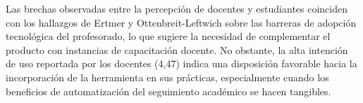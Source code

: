 Las brechas observadas entre la percepción de docentes y estudiantes coinciden con los hallazgos de Ertmer y Ottenbreit-Leftwich \cite{ref08_ertmer} sobre las barreras de adopción tecnológica del profesorado, lo que sugiere la necesidad de complementar el producto con instancias de capacitación docente. No obstante, la alta intención de uso reportada por los docentes (4,47) indica una disposición favorable hacia la incorporación de la herramienta en sus prácticas, especialmente cuando los beneficios de automatización del seguimiento académico se hacen tangibles.
